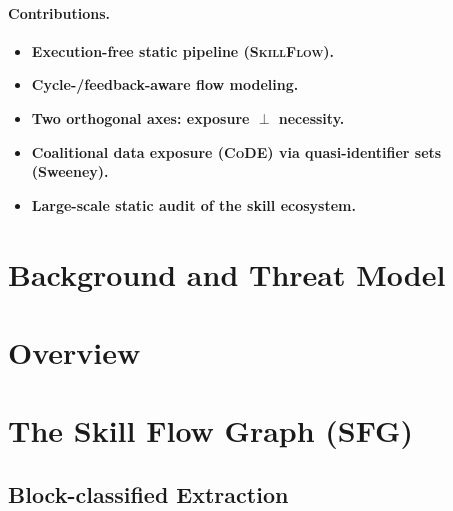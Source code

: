 \documentclass[sigconf,anonymous,review]{acmart}
\newcommand{\sys}{\textsc{SkillFlow}\xspace}
\newcommand{\sfg}{\textsc{SFG}\xspace}      %
\newcommand{\code}{\textsc{CoDE}\xspace}     %
\newcommand{\qi}{quasi-identifier\xspace}
\begin{document}
\paragraph{Contributions.}
\begin{itemize}
  \item \textbf{Execution-free static pipeline (\sys).} %
  \item \textbf{Cycle-/feedback-aware flow modeling.} %
  \item \textbf{Two orthogonal axes: exposure $\perp$ necessity.} %
  \item \textbf{Coalitional data exposure (\code) via \qi{} sets (Sweeney).} %
  \item \textbf{Large-scale static audit of the skill ecosystem.} %
\end{itemize}

\section{Background and Threat Model}\label{sec:bg}

\section{Overview}\label{sec:overview}

\section{The Skill Flow Graph (\sfg)}\label{sec:sfg}
\subsection{Block-classified Extraction}\label{sec:sfg:extract}
\end{document}

